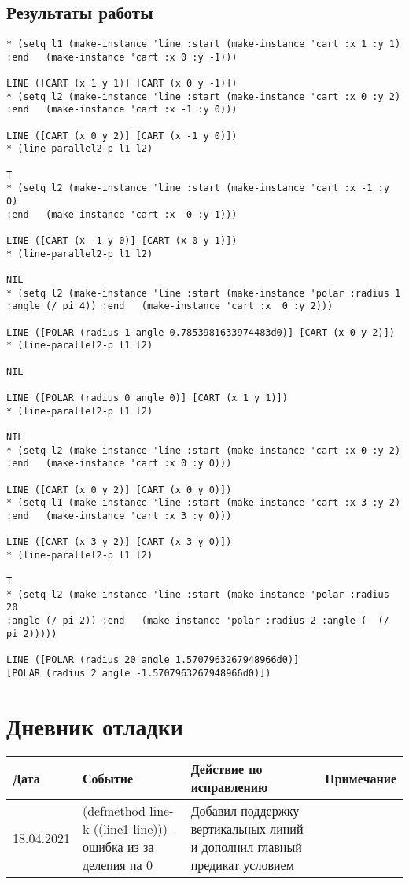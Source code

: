 \documentclass[12pt]{article}
\begin{document}
\subsection{Результаты работы}
\begin{verbatim}
* (setq l1 (make-instance 'line :start (make-instance 'cart :x 1 :y 1) 
:end   (make-instance 'cart :x 0 :y -1)))

LINE ([CART (x 1 y 1)] [CART (x 0 y -1)])
* (setq l2 (make-instance 'line :start (make-instance 'cart :x 0 :y 2) 
:end   (make-instance 'cart :x -1 :y 0)))

LINE ([CART (x 0 y 2)] [CART (x -1 y 0)])
* (line-parallel2-p l1 l2)

T
* (setq l2 (make-instance 'line :start (make-instance 'cart :x -1 :y 0) 
:end   (make-instance 'cart :x  0 :y 1)))

LINE ([CART (x -1 y 0)] [CART (x 0 y 1)])
* (line-parallel2-p l1 l2)

NIL
* (setq l2 (make-instance 'line :start (make-instance 'polar :radius 1 
:angle (/ pi 4)) :end   (make-instance 'cart :x  0 :y 2)))

LINE ([POLAR (radius 1 angle 0.7853981633974483d0)] [CART (x 0 y 2)])
* (line-parallel2-p l1 l2)

NIL

LINE ([POLAR (radius 0 angle 0)] [CART (x 1 y 1)])
* (line-parallel2-p l1 l2)

NIL
* (setq l2 (make-instance 'line :start (make-instance 'cart :x 0 :y 2) 
:end   (make-instance 'cart :x 0 :y 0)))

LINE ([CART (x 0 y 2)] [CART (x 0 y 0)])
* (setq l1 (make-instance 'line :start (make-instance 'cart :x 3 :y 2) 
:end   (make-instance 'cart :x 3 :y 0)))

LINE ([CART (x 3 y 2)] [CART (x 3 y 0)])
* (line-parallel2-p l1 l2)

T
* (setq l2 (make-instance 'line :start (make-instance 'polar :radius 20 
:angle (/ pi 2)) :end   (make-instance 'polar :radius 2 :angle (- (/ pi 2)))))

LINE ([POLAR (radius 20 angle 1.5707963267948966d0)]
[POLAR (radius 2 angle -1.5707963267948966d0)])
\end{verbatim}
%

\section{Дневник отладки}
\begin{tabular}{|p{50pt}|p{130pt}|p{130pt}|p{70pt}|}
\hline
Дата & Событие & Действие по исправлению & Примечание \\ \hline
18.04.2021 & (defmethod line-k ((line1 line))) - ошибка из-за деления на 0 & Добавил поддержку вертикальных линий и дополнил главный предикат условием &\\
\hline
\end{tabular}
\end{document}
